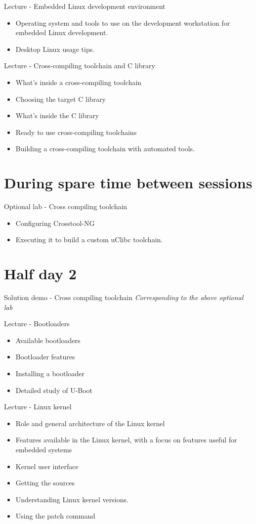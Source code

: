 \documentclass[a4paper,12pt,obeyspaces,spaces,hyphens]{article}
\begin{document}
\feagendatwocolumn
{Lecture - Embedded Linux development environment}
{
  \begin{itemize}
  \item Operating system and tools to use on the development
        workstation for embedded Linux development.
  \item Desktop Linux usage tips.
  \end{itemize}
}
{Lecture - Cross-compiling toolchain and C library}
{
  \begin{itemize}
  \item What's inside a cross-compiling toolchain
  \item Choosing the target C library
  \item What's inside the C library
  \item Ready to use cross-compiling toolchains
  \item Building a cross-compiling toolchain with automated tools.
  \end{itemize}
}

\section{During spare time between sessions}

\feagendaonecolumn
{Optional lab - Cross compiling toolchain}
{
  \begin{itemize}
  \item Configuring Crosstool-NG
  \item Executing it to build a custom uClibc toolchain.
  \end{itemize}
}

\section{Half day 2}

\feagendaonecolumn
{Solution demo - Cross compiling toolchain}
{
  {\em Corresponding to the above optional lab}
}

\feagendaonecolumn
{Lecture - Bootloaders}
{
  \begin{itemize}
  \item Available bootloaders
  \item Bootloader features
  \item Installing a bootloader
  \item Detailed study of U-Boot
  \end{itemize}
}

\feagendaonecolumn
{Lecture - Linux kernel}
{
  \begin{itemize}
  \item Role and general architecture of the Linux kernel
  \item Features available in the Linux kernel,
        with a focus on features useful for embedded systems
  \item Kernel user interface
  \item Getting the sources
  \item Understanding Linux kernel versions.
  \item Using the patch command
  \end{itemize}
}
\end{document}
